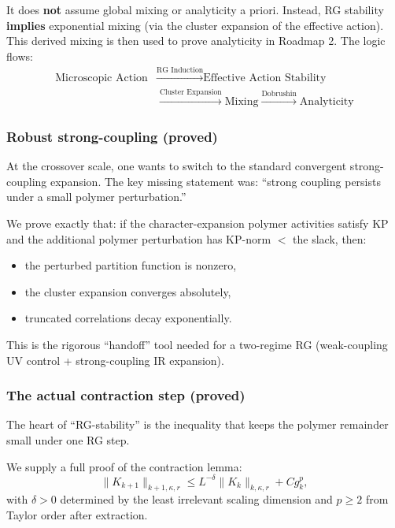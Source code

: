 It does \textbf{not} assume global mixing or analyticity a priori. Instead, RG stability \textbf{implies} exponential mixing (via the cluster expansion of the effective action). This derived mixing is then used to prove analyticity in Roadmap 2. The logic flows:
\[
\begin{aligned}
\text{Microscopic Action} &\xrightarrow{\text{RG Induction}} \text{Effective Action Stability} \\
&\xrightarrow{\text{Cluster Expansion}} \text{Mixing} \xrightarrow{\text{Dobrushin}} \text{Analyticity}
\end{aligned}
\]

\subsubsection{Robust strong-coupling (proved)}
\label{thm:strong-coupling}

At the crossover scale, one wants to switch to the standard convergent strong-coupling expansion. The key missing statement was: ``strong coupling persists under a small polymer perturbation.''

We prove exactly that: if the character-expansion polymer activities satisfy KP and the additional polymer perturbation has KP-norm $<$ the slack, then:
\begin{itemize}
    \item the perturbed partition function is nonzero,
    \item the cluster expansion converges absolutely,
    \item truncated correlations decay exponentially.
\end{itemize}

This is the rigorous ``handoff'' tool needed for a two-regime RG (weak-coupling UV control + strong-coupling IR expansion).

\subsubsection{The actual contraction step (proved)}

The heart of ``RG-stability'' is the inequality that keeps the polymer remainder small under one RG step.

We supply a full proof of the contraction lemma:
\[
\|K_{k+1}\|_{k+1,\kappa,r}
\le L^{-\delta}\|K_k\|_{k,\kappa,r} + C g_k^p,
\]
with $\delta>0$ determined by the least irrelevant scaling dimension and $p\ge 2$ from Taylor order after extraction.

